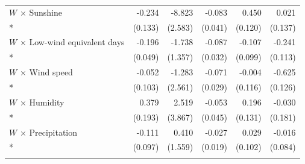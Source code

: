 \begin{longtable}{lrrrrr}
\addlinespace[1pt]
$W$ $\times$ Sunshine & -0.234 & -8.823 & -0.083 & 0.450 & 0.021 \\*
 & (0.133) & (2.583) & (0.041) & (0.120) & (0.137) \\
\addlinespace[1pt]
$W$ $\times$ Low-wind equivalent days & -0.196 & -1.738 & -0.087 & -0.107 & -0.241 \\*
 & (0.049) & (1.357) & (0.032) & (0.099) & (0.113) \\
\addlinespace[1pt]
$W$ $\times$ Wind speed & -0.052 & -1.283 & -0.071 & -0.004 & -0.625 \\*
 & (0.103) & (2.561) & (0.029) & (0.116) & (0.126) \\
\addlinespace[1pt]
$W$ $\times$ Humidity & 0.379 & 2.519 & -0.053 & 0.196 & -0.030 \\*
 & (0.193) & (3.867) & (0.045) & (0.131) & (0.181) \\
\addlinespace[1pt]
$W$ $\times$ Precipitation & -0.111 & 0.410 & -0.027 & 0.029 & -0.016 \\*
 & (0.097) & (1.559) & (0.019) & (0.102) & (0.084) \\
\addlinespace[1pt]
\end{longtable}
